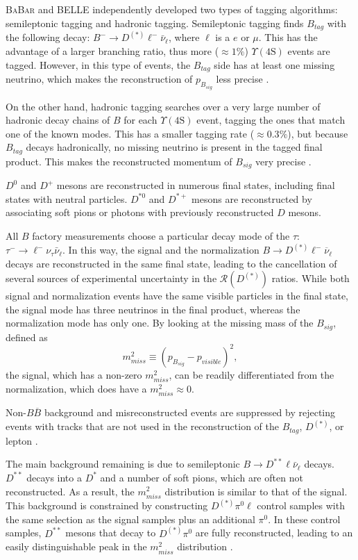 \documentclass[12pt,letterpaper]{article}
\def\BaBar/{\textsc{BaBar}}
\def\Y4S/{\ensuremath{\Upsilon(\text{4S})}}
\def\RDDst/{\ensuremath{\mathcal{R}(D^{(*)})}}
\begin{document}
\BaBar/ and BELLE independently developed two types of tagging algorithms:
semileptonic tagging and hadronic tagging.
Semileptonic tagging finds $B_{tag}$ with the following decay:
$B^- \rightarrow D^{(*)} \ell^- \bar{\nu}_\ell$, where $\ell$ is a $e$ or $\mu$.
This has the advantage of a larger branching ratio, thus more ($\approx 1\%$)
\Y4S/ events are tagged.
However, in this type of events, the $B_{tag}$ side has at least one missing neutrino, which
makes the reconstruction of $p_{B_{sig}}$ less precise \cite{Ciezarek:2017yzh}.

On the other hand, hadronic tagging searches over a very large number of
hadronic decay chains of $B$ for each \Y4S/ event, tagging the ones that match
one of the known modes.
This has a smaller tagging rate ($\approx 0.3\%$), but because $B_{tag}$ decays
hadronically, no missing neutrino is present in the tagged final product.
This makes the reconstructed momentum of $B_{sig}$ very
precise \cite{Lees:2013uzd,Ciezarek:2017yzh}.

$D^{0}$ and $D^{+}$ mesons are reconstructed in numerous final states, including final states with neutral particles.
$D^{*0}$ and $D^{*+}$ mesons are reconstructed by associating soft pions or photons with previously reconstructed $D$ mesons.

All $B$ factory measurements choose a particular decay mode of the $\tau$:
$\tau^- \rightarrow \ell^- \nu_\tau \bar{\nu}_\ell$. In this way, the signal and
the normalization $B \rightarrow D^{(*)} \ell^- \overline{\nu}_\ell$ decays
are reconstructed in the same final state, leading to the cancellation of
several sources of experimental uncertainty in the \RDDst/ ratios.
While both signal and normalization events have the same visible particles in the final state,
the signal mode has three neutrinos in the final product,
whereas the normalization mode has only one.
By looking at the missing mass of the $B_{sig}$, defined as
\begin{equation}
    m^2_{miss} \equiv \left(p_{B_{sig}} - p_{visible}\right)^2,
\end{equation}
the signal, which has a non-zero $m^2_{miss}$, can be readily differentiated
from the normalization, which does have a $m^2_{miss} \approx 0$.

Non-$B \overline{B}$ background and misreconstructed events are suppressed by
rejecting events with tracks that are not used in the reconstruction of the $B_{tag}$, $D^{(*)}$, or lepton \cite{Ciezarek:2017yzh}.

The main background remaining is due to semileptonic $B \rightarrow D^{**} \ell \bar{\nu}_\ell$ decays.
$D^{**}$ decays into a $D^{*}$ and a number of soft pions, which are often not reconstructed.
As a result, the $m^2_{miss}$ distribution is similar to that of the signal.
This background is constrained by constructing $D^{(*)}\pi^0\ell$ control samples with the same selection as the signal samples plus an additional $\pi^0$.
In these control samples, $D^{**}$ mesons that decay to $D^{(*)} \pi^0$ are fully reconstructed, leading to an easily distinguishable peak in the $m^2_{miss}$ distribution \cite{Lees:2013uzd}.
\end{document}
